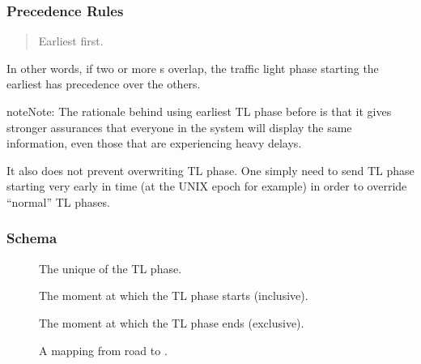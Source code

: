 \documentclass[letterpaper,10pt,english]{sphinxmanual}
\begin{document}
\subsubsection{Precedence Rules}
\label{\detokenize{taxonomy_serialization:precedence-rules}}\begin{quote}

Earliest {\hyperref[\detokenize{taxonomy_serialization:traffic-light-phase}]{}} first.
\end{quote}

In other words, if two or more {\hyperref[\detokenize{taxonomy_serialization:traffic-light-phase}]{}}s overlap, the traffic light phase starting the earliest has precedence over the others.

\begin{sphinxadmonition}{note}{Note:}
The rationale behind using earliest TL phase before is that it gives stronger assurances that everyone in the system will display the same information, even those that are experiencing heavy delays.

It also does not prevent overwriting TL phase.
One simply need to send TL phase starting very early in time (at the UNIX epoch for example) in order to override “normal” TL phases.
\end{sphinxadmonition}


\subsubsection{Schema}
\label{\detokenize{taxonomy_serialization:schema}}\begin{description}
\item[{}] \leavevmode
The unique {\hyperref[\detokenize{taxonomy_serialization:identifier}]{}} of the TL phase.

\item[{}] \leavevmode
The moment at which the TL phase starts (inclusive).

\item[{}] \leavevmode
The moment at which the TL phase ends (exclusive).

\item[{}] \leavevmode
A mapping from road {\hyperref[\detokenize{taxonomy_serialization:identifier}]{}} to {\hyperref[\detokenize{taxonomy_serialization:traffic-light-value}]{}}.

\end{description}
\end{document}
